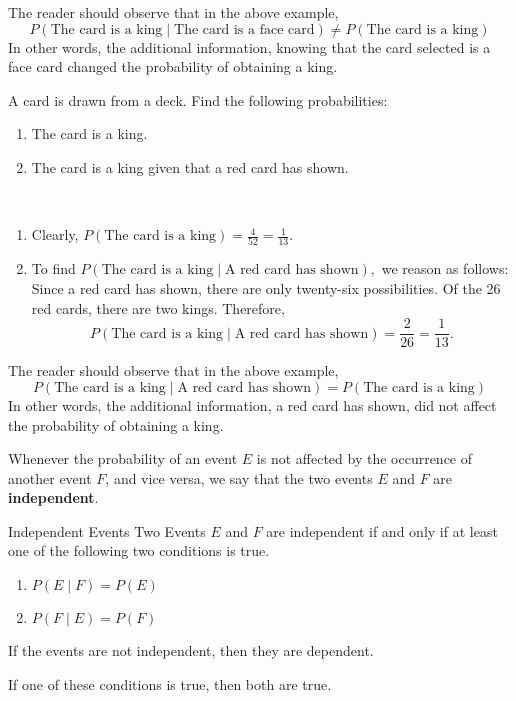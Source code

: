 The reader should observe that in the above example,
\[ P(\text{The card is a king} \mid \text{The card is a face card}) \neq P(\text{The card is a king}) \]
In other words, the additional information, knowing that the card selected is a face card changed the probability of obtaining a king.

\begin{example}\label{example_conditional_proability_independent_events}
    A card is drawn from a deck. Find the following probabilities:
    \begin{enumerate}
        \item The card is a king.
        \item The card is a king given that a red card has shown.
    \end{enumerate}
\end{example}

\begin{solution}~

    \begin{enumerate}
        \item Clearly, \( P(\text{The card is a king}) = \frac{4}{52} = \frac{1}{13}. \)
        \item To find \( P(\text{The card is a king} \mid \text{A red card has shown}), \) we reason as follows:
              Since a red card has shown, there are only twenty-six possibilities. Of the 26 red cards, there are two kings. Therefore,
              \[ P(\text{The card is a king} \mid \text{A red card has shown}) = \frac{2}{26} = \frac{1}{13}. \]


    \end{enumerate}
\end{solution}

The reader should observe that in the above example,
\[ P(\text{The card is a king} \mid \text{A red card has shown}) = P(\text{The card is a king}) \]
In other words, the additional information, a red card has shown, did not affect the probability of obtaining a king.

\begin{definition}
    Whenever the probability of an event \(E\) is not affected by the occurrence of another event \(F\), and vice versa, we say that the two events \(E\) and \(F\) are \textbf{independent}.
\end{definition}


\begin{summarybox}{Independent Events}\label{summary_independent_events}
    Two Events \(E\) and \(F\) are independent if and only if at least one of the following two conditions is true.
    \begin{enumerate}
        \item \(P(E \mid F) = P(E)\)
        \item \(P(F \mid E) = P(F)\)
    \end{enumerate}
    If the events are not independent, then they are dependent.

    If one of these conditions is true, then both are true.
\end{summarybox}

